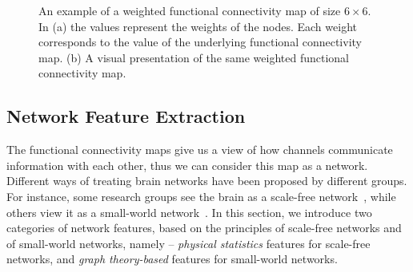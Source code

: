\begin{figure}[t]
\centering
	\leavevmode
{}
\caption{An example of a weighted functional connectivity map of size $6 \times 6$. In (a) the values represent the weights of the nodes. Each weight corresponds to the value of the underlying functional connectivity map. (b) A visual presentation of the same weighted functional connectivity map.}\label{fig:weightednetwork}
\end{figure}


\subsection{Network Feature Extraction}
The functional connectivity maps give us a view of how channels communicate information with each other, thus we can consider this map as a network. Different ways of treating brain networks have been proposed by different groups. For instance, some research groups see the brain as a scale-free network~\cite{eguiluz2005scale}, while others view it as a small-world network~\cite{bassett2006small}. In this section, we introduce two categories of network features, based on the principles of scale-free networks and of small-world networks, namely -- \emph{physical statistics} features for scale-free networks, and \emph{graph theory-based} features for small-world networks.

